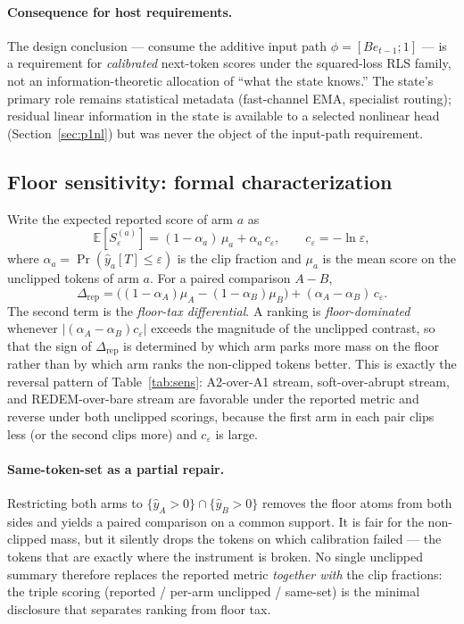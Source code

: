 \documentclass[preprint,12pt]{elsarticle}
\begin{document}
\paragraph{Consequence for host requirements.}
The design conclusion --- consume the additive input path
$\phi=[B e_{t-1};1]$ --- is a requirement for \emph{calibrated}
next-token scores under the squared-loss RLS family, not an
information-theoretic allocation of ``what the state knows.'' The
state's primary role remains statistical metadata (fast-channel EMA,
specialist routing); residual linear information in the state is
available to a selected nonlinear head (Section~\ref{sec:p1nl}) but
was never the object of the input-path requirement.

\subsection{Floor sensitivity: formal characterization}
\label{sec:floor}

Write the expected reported score of arm $a$ as
\begin{equation}
\mathbb{E}[S_\varepsilon^{(a)}]
  = (1-\alpha_a)\,\mu_a + \alpha_a\, c_\varepsilon,
  \qquad c_\varepsilon=-\ln\varepsilon,
\label{eq:floordecomp}
\end{equation}
where $\alpha_a=\Pr(\hat y_a[T]\le\varepsilon)$ is the clip fraction and
$\mu_a$ is the mean score on the unclipped tokens of arm $a$. For a
paired comparison $A-B$,
\begin{equation}
\Delta_{\mathrm{rep}}
  = \bigl((1-\alpha_A)\mu_A-(1-\alpha_B)\mu_B\bigr)
    + (\alpha_A-\alpha_B)\,c_\varepsilon.
\label{eq:floordelta}
\end{equation}
The second term is the \emph{floor-tax differential}. A ranking is
\emph{floor-dominated} whenever
$|(\alpha_A-\alpha_B)c_\varepsilon|$ exceeds the magnitude of the
unclipped contrast, so that the sign of $\Delta_{\mathrm{rep}}$ is
determined by which arm parks more mass on the floor rather than by
which arm ranks the non-clipped tokens better. This is exactly the
reversal pattern of Table~\ref{tab:sens}: A2-over-A1 stream,
soft-over-abrupt stream, and REDEM-over-bare stream are favorable
under the reported metric and reverse under both unclipped scorings,
because the first arm in each pair clips less (or the second clips
more) and $c_\varepsilon$ is large.

\paragraph{Same-token-set as a partial repair.}
Restricting both arms to
$\{\hat y_A>0\}\cap\{\hat y_B>0\}$ removes the floor atoms from both
sides and yields a paired comparison on a common support. It is fair
for the non-clipped mass, but it silently drops the tokens on which
calibration failed --- the tokens that are exactly where the
instrument is broken. No single unclipped summary therefore replaces
the reported metric \emph{together with} the clip fractions: the
triple scoring (reported / per-arm unclipped / same-set) is the
minimal disclosure that separates ranking from floor tax.
\end{document}
